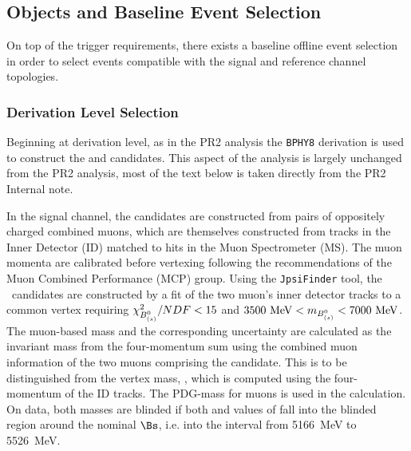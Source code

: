 \subsection{Objects and Baseline Event Selection}
\label{subsec:ObjectsAndBaselineSelection}
On top of the trigger requirements, there exists a baseline offline event selection in order to select events compatible with the signal and reference channel topologies. 

\subsubsection{Derivation Level Selection}
\label{subsubsec:DerivationLevelSelection}

Beginning at derivation level, as in the PR2 analysis the \verb|BPHY8| derivation is used to construct the \bmeson and \Jpsi candidates. 
This aspect of the analysis is largely unchanged from the PR2 analysis, most of the text below is taken directly from the PR2 Internal note. 

In the signal channel, the \Bds candidates are constructed from pairs of oppositely charged combined muons, which are themselves constructed from tracks in the Inner Detector (ID) matched to hits in the Muon Spectrometer (MS). 
The muon momenta are calibrated before vertexing following the recommendations of the Muon Combined Performance (MCP) group. 
Using the \texttt{JpsiFinder} tool, the \Bds\ candidates are 
constructed by a fit of the two muon's inner detector tracks to a
common vertex requiring $\chi^2_{B_{(s)}^0}/NDF < 15$ and $3500~\mathrm{MeV} 
< m_{B_{(s)}^0} < 7000~\mathrm{MeV}$.  
The muon-based mass \mucalcmassBds and the corresponding 
uncertainty are calculated as the invariant
mass from the four-momentum sum using the combined muon
information of the two muons comprising the candidate.  
This is to be distinguished from the vertex mass, \muvtxmassBds, which is computed using the four-momentum of the ID tracks. 
The PDG-mass for muons is used in the \mucalcmassBds calculation.
On data, both masses are blinded if both \mucalcmassBds and \muvtxmassBds values of fall into the blinded region around the nominal $\Bs$, i.e. into the interval from 5166~MeV to 5526~MeV.

